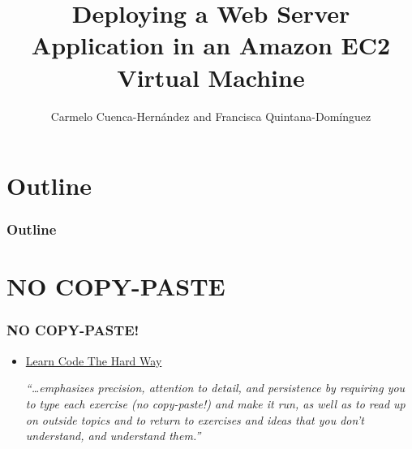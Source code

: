 \documentclass{beamer}
\title{Deploying a Web Server Application in an Amazon EC2 Virtual Machine}
\author[C. Cuenca, F. Quintana]{Carmelo Cuenca-Hernández and Francisca Quintana-Domínguez}
\date{}
\begin{document}
\begin{frame}
	\titlepage
\end{frame}


\section*{Outline}
\begin{frame}
  \frametitle{Outline}
  \tableofcontents[currentsection,currentsubsection, sectionstyle=show] 
\end{frame}

%


\section*{NO COPY-PASTE}
\begin{frame}[fragile]
\frametitle{\alert{NO COPY-PASTE!}}
\begin{itemize}
\item \href{http://www.learncodethehardway.org/}{Learn Code The Hard Way}


\emph{``\dots emphasizes precision, attention to detail, and persistence by requiring you to type
each exercise \alert{(no copy-paste!)} and make it run, as well as to read up on outside topics
and to return to exercises and ideas that you don’t understand, and understand them.''}
\end{itemize}

\end{frame}
\end{document}
